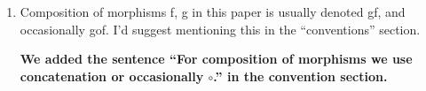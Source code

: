 \documentclass[reqno]{amsart}
\def\chris{\color{purple} Christina: }
\def\john{\color{red} John: }
\def\kenny{\color{blue} Kenny: }
\begin{document}
\begin{enumerate}

\item Composition of morphisms f, g in this paper is usually denoted gf, and occasionally gof. I’d suggest mentioning this in the “conventions” 
section.

{\bf We added the sentence ``For composition of morphisms we use concatenation or occasionally $\circ$.'' in the convention section.} 

 










\end{enumerate}
\end{document}
